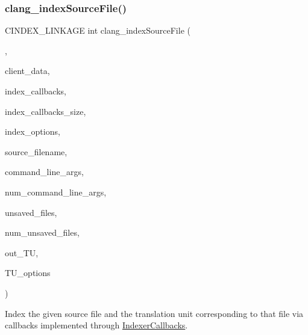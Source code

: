 \subsubsection{\texorpdfstring{clang\+\_\+index\+Source\+File()}{clang\_indexSourceFile()}}
{\footnotesize\ttfamily C\+I\+N\+D\+E\+X\+\_\+\+L\+I\+N\+K\+A\+GE int clang\+\_\+index\+Source\+File (\begin{DoxyParamCaption}\item[{\mbox{\hyperlink{group__CINDEX__HIGH_gac8d30d3e3fb34d887b611e7c6de3afb6}{C\+X\+Index\+Action}}}]{,  }\item[{\mbox{\hyperlink{group__CINDEX_gacfa40c3de26d228c0d898403c2c21612}{C\+X\+Client\+Data}}}]{client\+\_\+data,  }\item[{\mbox{\hyperlink{structIndexerCallbacks}{Indexer\+Callbacks}} $\ast$}]{index\+\_\+callbacks,  }\item[{unsigned}]{index\+\_\+callbacks\+\_\+size,  }\item[{unsigned}]{index\+\_\+options,  }\item[{const char $\ast$}]{source\+\_\+filename,  }\item[{const char $\ast$const $\ast$}]{command\+\_\+line\+\_\+args,  }\item[{int}]{num\+\_\+command\+\_\+line\+\_\+args,  }\item[{struct \mbox{\hyperlink{structCXUnsavedFile}{C\+X\+Unsaved\+File}} $\ast$}]{unsaved\+\_\+files,  }\item[{unsigned}]{num\+\_\+unsaved\+\_\+files,  }\item[{\mbox{\hyperlink{group__CINDEX_gacdb7815736ca709ce9a5e1ec2b7e16ac}{C\+X\+Translation\+Unit}} $\ast$}]{out\+\_\+\+TU,  }\item[{unsigned}]{T\+U\+\_\+options }\end{DoxyParamCaption})}



Index the given source file and the translation unit corresponding to that file via callbacks implemented through \mbox{\hyperlink{structIndexerCallbacks}{Indexer\+Callbacks}}. 


